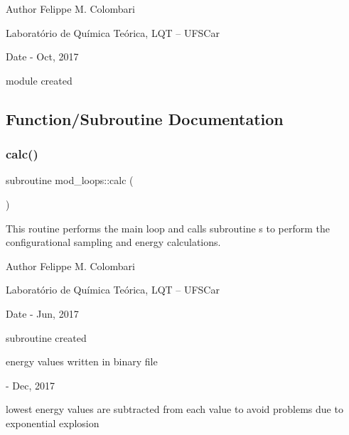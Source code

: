 \begin{DoxyAuthor}{Author}
Felippe M. Colombari
\begin{DoxyItemize}
\item Laboratório de Química Teórica, L\+QT -- U\+F\+S\+Car 
\end{DoxyItemize}
\end{DoxyAuthor}
\begin{DoxyDate}{Date}
-\/ Oct, 2017
\begin{DoxyItemize}
\item module created 
\end{DoxyItemize}
\end{DoxyDate}


\subsection{Function/\+Subroutine Documentation}
\mbox{\label{namespacemod__loops_a6e4de9cf9c585c364502a63d328071bd}} 
\subsubsection{\texorpdfstring{calc()}{calc()}}
{\footnotesize\ttfamily subroutine mod\+\_\+loops\+::calc (\begin{DoxyParamCaption}{ }\end{DoxyParamCaption})}



This routine performs the main loop and calls subroutine s to perform the configurational sampling and energy calculations. 

\begin{DoxyAuthor}{Author}
Felippe M. Colombari
\begin{DoxyItemize}
\item Laboratório de Química Teórica, L\+QT -- U\+F\+S\+Car 
\end{DoxyItemize}
\end{DoxyAuthor}
\begin{DoxyDate}{Date}
-\/ Jun, 2017
\begin{DoxyItemize}
\item subroutine created
\item energy values written in binary file 
\end{DoxyItemize}

-\/ Dec, 2017
\begin{DoxyItemize}
\item lowest energy values are subtracted from each value to avoid problems due to exponential explosion 
\end{DoxyItemize}
\end{DoxyDate}



